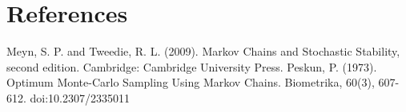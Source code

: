 \section{References}

Meyn, S. P. and Tweedie, R. L. (2009). Markov Chains and Stochastic Stability, second edition. Cambridge: Cambridge University Press.
\newline
Peskun, P. (1973). Optimum Monte-Carlo Sampling Using Markov Chains. Biometrika, 60(3), 607-612. doi:10.2307/2335011